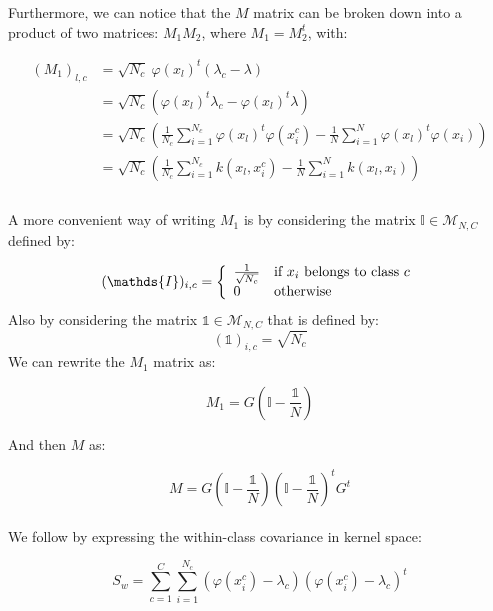 Furthermore, we can notice that the $M$ matrix can be broken down into a product of two matrices: $M_1M_2$, where $M_1 = M_2^t$, with:

\begin{align*}
(M_1)_{l, c} &= \sqrt{N_c}~\varphi(x_l)^t(\lambda_c - \lambda)\\
             &= \sqrt{N_c}\left(\varphi(x_l)^t\lambda_c -\varphi(x_l)^t\lambda\right) \\
             &= \sqrt{N_c}\left(\frac{1}{N_c} \sum_{i=1}^{N_c} \varphi(x_l)^t\varphi(x_i^c) -
                 \frac{1}{N}\sum_{i=1}^N\varphi(x_l)^t\varphi(x_i)\right) \\
             &= \sqrt{N_c}\left(\frac{1}{N_c} \sum_{i = 1}^{N_c} k(x_l, x_i^c) -
                \frac{1}{N}\sum_{i=1}^N k(x_l, x_i)\right) \\
\end{align*}

\paragraph{}
A more convenient way of writing $M_1$ is by considering the matrix $\mathds{I} \in \mathcal{M}_{N,C}$ defined by:

$$ (\mathds{I})_{i, c} = \left\{ \begin{array}{ll}
                                  \frac{1}{\sqrt{N_c}} & \textnormal{if $x_i$ belongs to class $c$} \\
                                  0 & \textnormal{otherwise}
                               \end{array}
                        \right.$$
Also by considering the matrix $\mathds{1} \in \mathcal{M}_{N,C}$ that is defined by:
$$ (\mathds{1})_{i, c} = \sqrt{N_c} $$
We can rewrite the $M_1$ matrix as:

$$M_1 = G\left( \mathds{I} - \frac{\mathds{1}}{N} \right)$$

And then $M$ as:

$$M = G\left( \mathds{I} - \frac{\mathds{1}}{N}\right)\left(\mathds{I} - \frac{\mathds{1}}{N}\right)^tG^t$$

\paragraph{}
We follow by expressing the within-class covariance in kernel space:

\begin{equation*}
S_w = \sum_{c = 1}^C \sum_{i = 1}^{N_c} (\varphi(x_i^c) - \lambda_c)(\varphi(x_i^c) -
\lambda_c)^t
\end{equation*}

